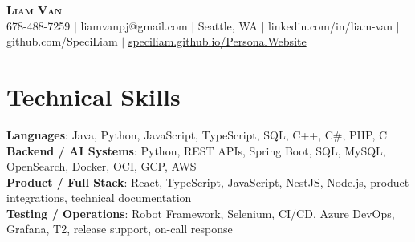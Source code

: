 \documentclass[letterpaper,11pt]{article}
\begin{document}

%
\begin{center}
    \textbf{\Huge \scshape Liam Van} \\ \vspace{1pt}
    \small 678-488-7259 $|$ \small {liamvanpj@gmail.com} $|$ Seattle, WA
 {{$|$ linkedin.com/in/liam-van} {$|$ github.com/SpeciLiam} {$|$ \href{https://speciliam.github.io/PersonalWebsite}{speciliam.github.io/PersonalWebsite}}}

\end{center}

\section{Technical Skills}
 \begin{itemize}[leftmargin=0.15in, label={}]
    \small{\item{
     \textbf{Languages}{: Java, Python, JavaScript, TypeScript, SQL, C++, C\#, PHP, C} \\
     \textbf{Backend / AI Systems}{: Python, REST APIs, Spring Boot, SQL, MySQL, OpenSearch, Docker, OCI, GCP, AWS} \\
     \textbf{Product / Full Stack}{: React, TypeScript, JavaScript, NestJS, Node.js, product integrations, technical documentation} \\
     \textbf{Testing / Operations}{: Robot Framework, Selenium, CI/CD, Azure DevOps, Grafana, T2, release support, on-call response} \\
    }}
 \end{itemize}
%
\end{document}
